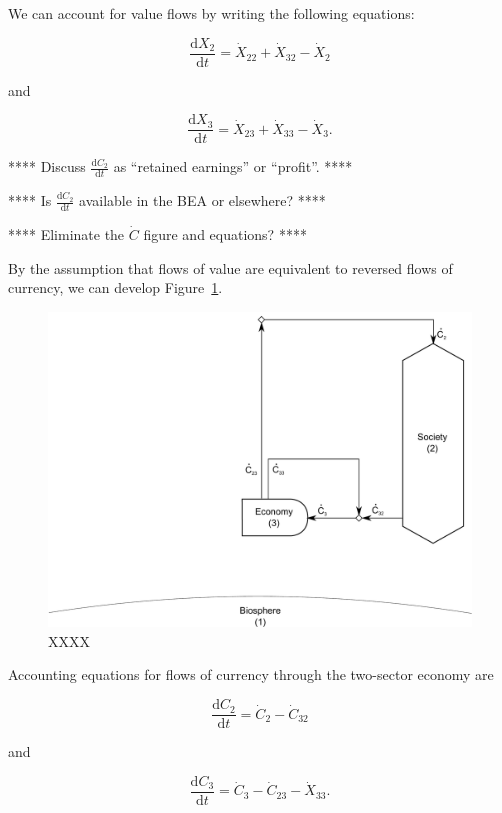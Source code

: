 We can account for value flows by writing
the following equations:

\begin{equation}
	\frac{\mathrm{d}X_2}{\mathrm{d}t}
	= \dot{X}_{22}
	+ \dot{X}_{32}
	- \dot{X}_{2}
\end{equation}

\noindent and

\begin{equation}
	\frac{\mathrm{d}X_3}{\mathrm{d}t}
	= \dot{X}_{23}
	+ \dot{X}_{33}
	- \dot{X}_{3}.
\end{equation}

**** Discuss $\frac{\mathrm{d}C_2}{\mathrm{d}t}$ as ``retained earnings'' or ``profit''. ****

**** Is $\frac{\mathrm{d}C_2}{\mathrm{d}t}$ available in the BEA or elsewhere? ****

**** Eliminate the $\dot{C}$ figure and equations? ****

By the assumption that flows of value are equivalent
to reversed flows of currency, we can develop Figure~\ref{fig:B_cash}.

\begin{figure}[h!]
\centering
\includegraphics[width=0.8\linewidth]{Part_3/Chapter_Values/images/2_sector_cash.pdf}
\caption{XXXX}
\label{fig:B_cash}
\end{figure}

Accounting equations for flows of currency through the two-sector
economy are

\begin{equation}
	\frac{\mathrm{d}C_2}{\mathrm{d}t}
	= \dot{C}_{2}
	- \dot{C}_{32}
\end{equation}

\noindent and

\begin{equation}
	\frac{\mathrm{d}C_3}{\mathrm{d}t}
	= \dot{C}_{3}
	- \dot{C}_{23}
	- \dot{X}_{33}.
\end{equation}


